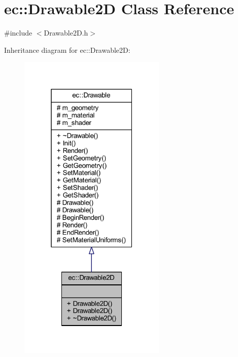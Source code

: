 \hypertarget{classec_1_1_drawable2_d}{}\section{ec\+:\+:Drawable2D Class Reference}
\label{classec_1_1_drawable2_d}


{\ttfamily \#include $<$Drawable2\+D.\+h$>$}



Inheritance diagram for ec\+:\+:Drawable2D\+:
\nopagebreak
\begin{figure}[H]
\begin{center}
\leavevmode
\includegraphics[width=199pt]{classec_1_1_drawable2_d__inherit__graph}
\end{center}
\end{figure}



